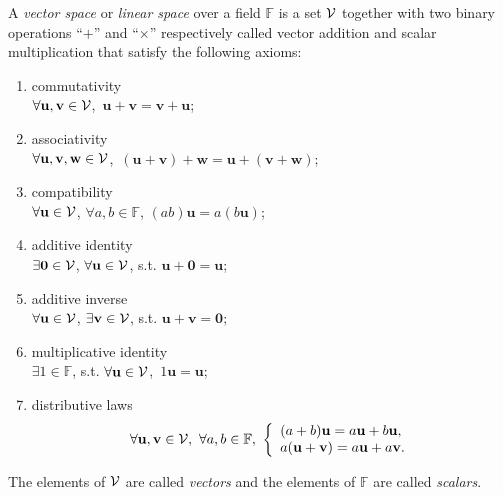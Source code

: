 \begin{defn}
  \label{def:vectorSpace}
  A \emph{vector space} or \emph{linear space}
  over a field $\mathbb{F}$ is a set ${\cal V}$
  together with two binary operations
  ``$+$'' and ``$\times$''
  respectively called vector addition and scalar multiplication
  that satisfy the following axioms:
  \begin{enumerate}[({VSA}-1)]\itemsep0em
  \item commutativity\\
    $\forall \mathbf{u},\mathbf{v}\in {\cal V}$,\ 
    $\mathbf{u}+\mathbf{v}=\mathbf{v}+\mathbf{u}$;
  \item associativity\\
    $\forall \mathbf{u},\mathbf{v}, \mathbf{w}\in {\cal V}$,\ 
    $(\mathbf{u}+\mathbf{v})+\mathbf{w}
    =\mathbf{u}+(\mathbf{v}+\mathbf{w})$;
  \item compatibility\\
    $\forall \mathbf{u}\in {\cal V}$, $\forall a,b\in \mathbb{F}$, 
    $(ab)\mathbf{u} = a(b\mathbf{u})$;
  \item additive identity\\
    $\exists \mathbf{0}\in {\cal V}$,
    $\forall \mathbf{u}\in{\cal V}$,
    s.t. $\mathbf{u}+\mathbf{0}=\mathbf{u}$;
  \item additive inverse\\
    $\forall \mathbf{u}\in{\cal V}$,
    $\exists \mathbf{v}\in {\cal V}$,
    s.t. $\mathbf{u}+\mathbf{v}=\mathbf{0}$;
  \item multiplicative identity\\
    $\exists 1 \in \mathbb{F}$, s.t.
    $\forall \mathbf{u}\in{\cal V}$,\ 
    $1\mathbf{u}=\mathbf{u}$;
  \item distributive laws\\
    \begin{equation*}
      \forall \mathbf{u},\mathbf{v}\in {\cal V},\ 
      \forall a,b\in \mathbb{F},\ 
      \left\{
        \begin{array}{l}
          (a+b)\mathbf{u}=a\mathbf{u}+b\mathbf{u}, \\
          a(\mathbf{u}+\mathbf{v})=a\mathbf{u}+a\mathbf{v}.
        \end{array}
      \right.
    \end{equation*}
  \end{enumerate}
  The elements of ${\cal V}$ are called \emph{vectors}
  and the elements of $\mathbb{F}$ are called \emph{scalars}.
\end{defn}

